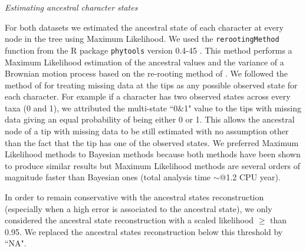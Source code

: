 \documentclass[12pt,letterpaper]{article}
\renewcommand{\subsection}[1]{%
\bigskip
\begin{center}
\begin{large}
\normalfont\itshape #1
\end{large}
\end{center}}
\begin{document}
\subsection{Estimating ancestral character states}
For both datasets we estimated the ancestral state of each character at every node in the tree using Maximum Likelihood.
We used the \texttt{rerootingMethod} function from the R package \texttt{phytools} version 0.4-45 \citep{phytools}.
This method performs a Maximum Likelihood estimation of the ancestral values and the variance of a Brownian motion process based on the re-rooting method of \citep{Yang01121995}.
We followed the method of \cite{Claddis} for treating missing data at the tips as any possible observed state for each character.
For example if a character has two observed states across every taxa (0 and 1), we attributed the multi-state ``0\&1" value to the tips with missing data giving an equal probability of being either 0 or 1.
This allows the ancestral node of a tip with missing data to be still estimated with no assumption other than the fact that the tip has one of the observed states.
We preferred Maximum Likelihood methods to Bayesian methods because both methods have been shown to produce similar results \citep{royer-carenzichoosing2013} but Maximum Likelihood methods are several orders of magnitude faster than Bayesian ones (total analysis time $\sim$@1.2 CPU year). 

In order to remain conservative with the ancestral states reconstruction (especially when a high error is associated to the ancestral state), we only considered the ancestral state reconstruction with a scaled likelihood $\geq$ than 0.95.
We replaced the ancestral states reconstruction below this threshold by ``NA".
\end{document}
